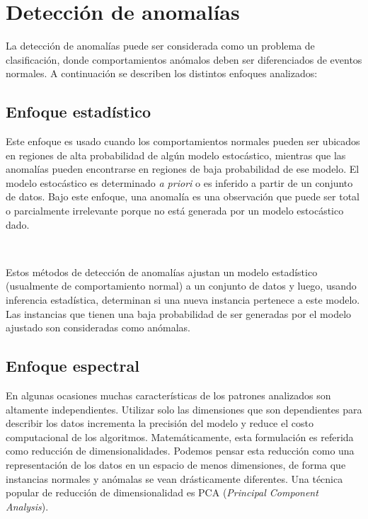\documentclass[a4paper,12pt, oneside]{article}
\begin{document}
\newpage

\section{Detección de anomalías}
La detección de anomalías puede ser considerada como un problema de clasificación, donde comportamientos anómalos deben ser diferenciados de eventos normales\cite{baddar2014anomaly}. A continuación se describen los distintos enfoques analizados:

\subsection{Enfoque estadístico}
Este enfoque es usado cuando los comportamientos normales pueden ser ubicados en regiones de alta probabilidad de algún modelo estocástico, mientras que las anomalías pueden encontrarse en regiones de baja probabilidad de ese modelo\cite{Chandola:2009:ADS:1541880.1541882}. El modelo estocástico es determinado \textit{a priori} o es inferido a partir de un conjunto de datos. Bajo este enfoque, una anomalía es una observación que puede ser total o parcialmente irrelevante porque no está generada por un modelo estocástico dado.

\

Estos métodos de detección de anomalías ajustan un modelo estadístico (usualmente de comportamiento normal) a un conjunto de datos y luego, usando inferencia estadística, determinan si una nueva instancia pertenece a este modelo. Las instancias que tienen una baja probabilidad de ser generadas por el modelo ajustado son consideradas como anómalas.

\subsection{Enfoque espectral}
En algunas ocasiones muchas características de los patrones analizados son altamente independientes. Utilizar solo las dimensiones que son dependientes para describir los datos incrementa la precisión del modelo y reduce el costo computacional de los algoritmos. Matemáticamente, esta formulación es referida como reducción de dimensionalidades\cite{wang2012geometric}. Podemos pensar esta reducción como una representación de los datos en un espacio de menos dimensiones, de forma que instancias normales y anómalas se vean drásticamente diferentes. Una técnica popular de reducción de dimensionalidad es PCA (\textit{Principal Component Analysis}).
\end{document}
